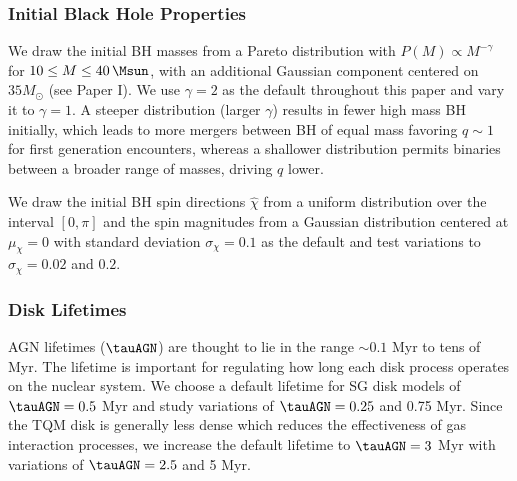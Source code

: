 \subsubsection{Initial Black Hole Properties}
We draw the initial BH masses from a Pareto distribution with $P(M) \propto M^{-\gamma}$ for $10\leq M \leq40\,\Msun$, with an additional Gaussian component centered on $35M_{\odot}$ (see Paper I).
We use $\gamma=2$ as the default throughout this paper and vary it to $\gamma=1$.
A steeper distribution (larger $\gamma$) results in fewer high mass BH initially, which leads to more mergers between BH of equal mass favoring $q\sim1$ for first generation encounters, whereas a shallower distribution permits binaries between a broader range of masses, driving $q$ lower.

We draw the initial BH spin directions $\hat{\chi}$ from a uniform distribution over the interval $[0,\pi]$ and the spin magnitudes from a Gaussian distribution centered at $\mu_\chi=0$ with standard deviation $\sigma_{\chi} = 0.1$ as the default and test variations to $\sigma_{\chi}=0.02$ and $0.2$.

\subsubsection{Disk Lifetimes}
AGN lifetimes ($\tauAGN$) are thought to lie in the range $\sim 0.1$ Myr to tens of Myr.
The lifetime is important for regulating how long each disk process operates on the nuclear system.
We choose a default lifetime for SG disk models of $\tauAGN=0.5$ Myr and study variations of $\tauAGN = 0.25$ and 0.75 Myr.
Since the TQM disk is generally less dense which reduces the effectiveness of gas interaction processes, we increase the default lifetime to $\tauAGN = 3$ Myr with variations of $\tauAGN = 2.5$ and 5 Myr.

